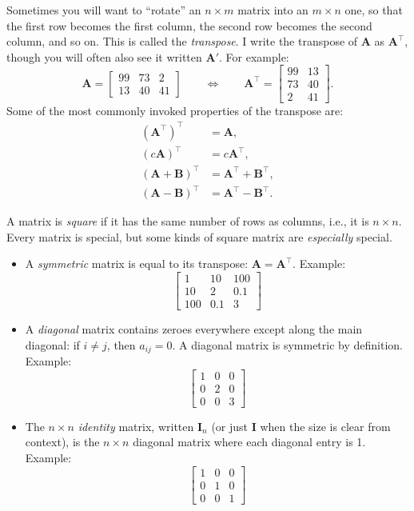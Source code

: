 \documentclass[
  12pt,
  oneside,openany]{book}
\begin{document}
Sometimes you will want to ``rotate'' an \(n \times m\) matrix into an \(m \times n\) one, so that the first row becomes the first column, the second row becomes the second column, and so on. This is called the \emph{transpose}. I write the transpose of \(\mathbf{A}\) as \(\mathbf{A}^\top\), though you will often also see it written \(\mathbf{A}'\). For example:
\[
\mathbf{A}
=
\begin{bmatrix}
  99 & 73 & 2 \\
  13 & 40 & 41
\end{bmatrix}
\qquad
\Leftrightarrow
\qquad
\mathbf{A}^\top =
\begin{bmatrix}
  99 & 13 \\
  73 & 40 \\
  2 & 41
\end{bmatrix}.
\]
Some of the most commonly invoked properties of the transpose are:
\[
\begin{aligned}
(\mathbf{A}^\top)^\top &= \mathbf{A}, \\
(c \mathbf{A})^\top &= c \mathbf{A}^\top, \\
(\mathbf{A} + \mathbf{B})^\top &= \mathbf{A}^\top + \mathbf{B}^\top, \\
(\mathbf{A} - \mathbf{B})^\top &= \mathbf{A}^\top - \mathbf{B}^\top.
\end{aligned}
\]

A matrix is \emph{square} if it has the same number of rows as columns, i.e., it is \(n \times n\). Every matrix is special, but some kinds of square matrix are \emph{especially} special.

\begin{itemize}
\item
  A \emph{symmetric} matrix is equal to its transpose: \(\mathbf{A} = \mathbf{A}^\top\). Example: \[
  \begin{bmatrix}
    1 & 10 & 100 \\
    10 & 2 & 0.1 \\
    100 & 0.1 & 3
  \end{bmatrix}\]
\item
  A \emph{diagonal} matrix contains zeroes everywhere except along the main diagonal: if \(i \neq j\), then \(a_{ij} = 0\). A diagonal matrix is symmetric by definition. Example: \[
  \begin{bmatrix}
    1 & 0 & 0 \\
    0 & 2 & 0 \\
    0 & 0 & 3
  \end{bmatrix}\]
\item
  The \(n \times n\) \emph{identity} matrix, written \(\mathbf{I}_n\) (or just \(\mathbf{I}\) when the size is clear from context), is the \(n \times n\) diagonal matrix where each diagonal entry is 1. Example: \[
  \begin{bmatrix}
    1 & 0 & 0 \\
    0 & 1 & 0 \\
    0 & 0 & 1
  \end{bmatrix}\]
\end{itemize}
\end{document}
